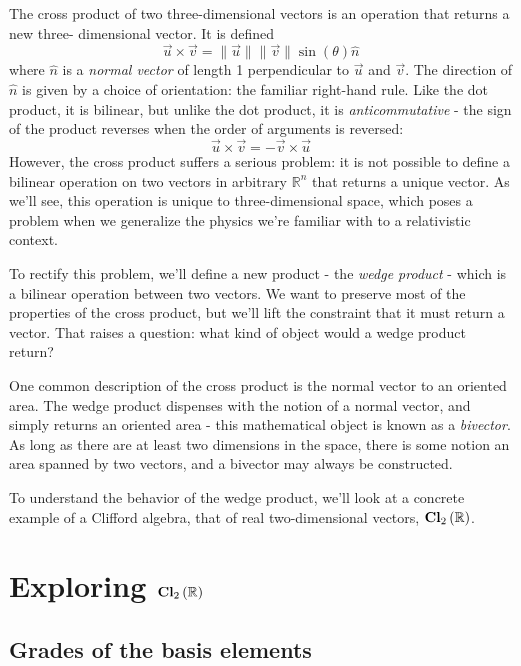 The cross product of two three-dimensional vectors is an operation that returns a new three-
dimensional vector. It is defined
\begin{equation}
\vec{u} \times \vec{v} = \lVert\vec{u}\rVert \lVert\vec{v}\rVert \sin\left(\theta\right) \hat{n}
\end{equation}
where $\hat{n}$ is a \textit{normal vector} of length 1 perpendicular to $\vec{u}$ and $\vec{v}$.
The direction of $\hat{n}$ is given by a choice of orientation: the familiar right-hand rule. Like
the dot product, it is bilinear, but unlike the dot product, it is \textit{anticommutative} - the
sign of the product reverses when the order of arguments is reversed:
\begin{equation}
\vec{u} \times \vec{v} = -\vec{v} \times \vec{u}
\end{equation}
However, the cross product suffers a serious problem: it is not possible to define a bilinear
operation on two vectors in arbitrary $\mathbb{R}^n$ that returns a unique vector. As we'll see,
this operation is unique to three-dimensional space, which poses a problem when we generalize the
physics we're familiar with to a relativistic context.

To rectify this problem, we'll define a new product - the \textit{wedge product} - which is a
bilinear operation between two vectors. We want to preserve most of the properties of the cross
product, but we'll lift the constraint that it must return a vector. That raises a question: what
kind of object would a wedge product return?

One common description of the cross product is the normal vector to an oriented area. The wedge
product dispenses with the notion of a normal vector, and simply returns an oriented area - this
mathematical object is known as a \textit{bivector}. As long as there are at least two dimensions in
the space, there is some notion an area spanned by two vectors, and a bivector may always be
constructed.

To understand the behavior of the wedge product, we'll look at a concrete example of a Clifford
algebra, that of real two-dimensional vectors, $\operatorname{\mathbf{Cl}}_{2}\left(\mathbb{R}\right)$.

\section{Exploring $\operatorname{\mathbf{Cl}}_{2}\left(\mathbb{R}\right)$}

\subsection{Grades of the basis elements}

